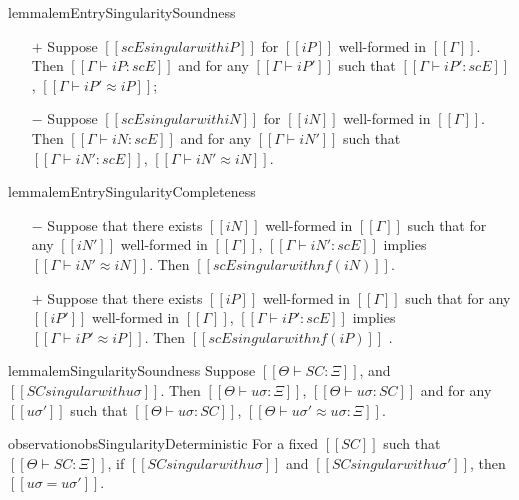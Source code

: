 \begin{restatable}{lemma}{lemEntrySingularitySoundness}
    \label{lemma:entry-singularity-soundness}
    \hfill
    \begin{itemize}
        \item [$+$] Suppose $[[scE singular with iP]]$ for $[[iP]]$ well-formed in $[[Γ]]$.
            Then $[[ Γ ⊢ iP : scE ]]$
            and for any $[[ Γ ⊢ iP']]$ such that $[[Γ ⊢ iP' : scE]]$, $[[Γ ⊢ iP' ≈ iP]]$;
        \item [$-$] Suppose $[[scE singular with iN]]$ for $[[iN]]$ well-formed in $[[Γ]]$.
            Then $[[ Γ ⊢ iN : scE ]]$
            and for any $[[ Γ ⊢ iN']]$ such that $[[Γ ⊢ iN' : scE]]$, $[[Γ ⊢ iN' ≈ iN]]$.
    \end{itemize}
\end{restatable}

\begin{restatable}{lemma}{lemEntrySingularityCompleteness}
    \label{lemma:entry-singularity-completeness}
    \hfill
    \begin{itemize}
        \item [$-$] Suppose that there exists $[[iN]]$ well-formed in $[[Γ]]$ 
            such that for any $[[iN']]$ well-formed in $[[Γ]]$,
            $[[Γ ⊢ iN' : scE]]$ implies $[[Γ ⊢ iN' ≈ iN]]$. 
            Then $[[scE singular with nf(iN)]]$.
        \item [$+$] Suppose that there exists $[[iP]]$ well-formed in $[[Γ]]$ 
            such that for any $[[iP']]$ well-formed in $[[Γ]]$,
            $[[Γ ⊢ iP' : scE]]$ implies $[[Γ ⊢ iP' ≈ iP]]$. 
            Then $[[scE singular with nf(iP)]]$ .
    \end{itemize}
\end{restatable}

\begin{restatable}{lemma}{lemSingularitySoundness}
    \label{lemma:singularity-soundness}
    Suppose $[[Θ ⊢ SC : Ξ]]$, and $[[SC singular with uσ]]$. 
    Then $[[ Θ ⊢ uσ : Ξ ]]$,
     $[[ Θ ⊢ uσ : SC ]]$ and for any 
    $[[uσ']]$ such that $[[Θ ⊢ uσ : SC]]$,
    $[[Θ ⊢ uσ' ≈ uσ : Ξ]]$.
\end{restatable}

\begin{restatable}{observation}{obsSingularityDeterministic}
    For a fixed $[[SC]]$ such that $[[Θ ⊢ SC : Ξ]]$,
    if $[[SC singular with uσ]]$ and $[[SC singular with uσ']]$,
    then $[[uσ = uσ']]$.
\end{restatable}

